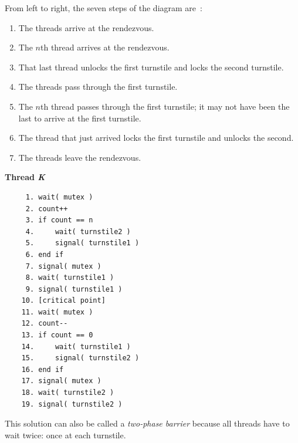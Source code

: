 From left to right, the seven steps of the diagram are~\cite{mte241}:
\begin{enumerate}
	\item The threads arrive at the rendezvous.
	\item The $n$th thread arrives at the rendezvous.
	\item That last thread unlocks the first turnstile and locks the second turnstile.
	\item The threads pass through the first turnstile.
	\item The $n$th thread passes through the first turnstile; it may not have been the last to arrive at the first turnstile.
	\item The thread that just arrived locks the first turnstile and unlocks the second.
	\item The threads leave the rendezvous.
\end{enumerate}

\textbf{Thread \textit{K}}\vspace{-2em}
  \begin{verbatim}
	 1. wait( mutex )
	 2. count++
	 3. if count == n
	 4.     wait( turnstile2 )
	 5.     signal( turnstile1 )
	 6. end if
	 7. signal( mutex )
	 8. wait( turnstile1 )
	 9. signal( turnstile1 )
	10. [critical point]
	11. wait( mutex )
	12. count--
	13. if count == 0
	14.     wait( turnstile1 )
	15.     signal( turnstile2 )
	16. end if
	17. signal( mutex )
	18. wait( turnstile2 )
	19. signal( turnstile2 )
  \end{verbatim}
\vspace{-2em}

This solution can also be called a \textit{two-phase barrier} because all threads have to wait twice: once at each turnstile.




